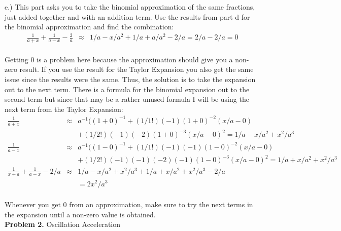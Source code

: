 \documentclass[11pt]{amsart}
\begin{document}
e.) This part asks you to take the binomial approximation of the same fractions, just added together and with an addition term. Use the results from part d for the binomial approximation and find the combination: \\ 
\begin{eqnarray*}
\frac{1}{a+x} + \frac{1}{a-x} - \frac{2}{a} &\approx& 1/a - x/a^{2} + 1/a + a/a^{2} -2/a = 2/a - 2/a = 0 
\end{eqnarray*} \\
Getting 0 is a problem here because the approximation should give you a non-zero result. If you use the result for the Taylor Expansion you also get the same issue since the results were the same. Thus, the solution is to take the expansion out to the next term. There is a formula for the binomial expansion out to the second term but since that may be a rather unused formula I will be using the next term from the Taylor Expansion: \\ 
\begin{eqnarray*} 
\frac{1}{a+x} &\approx&  a^{-1}((1+0)^{-1} + (1/1!)(-1)(1+0)^{-2}(x/a-0)   \\
                     & & + (1/2!)(-1)(-2)(1+0)^{-3}(x/a-0)^{2} = 1/a - x/a^{2} + x^{2}/a^{3} \\
\frac{1}{a-x}  &\approx&  a^{-1}((1-0)^{-1} + (1/1!)(-1)(-1)(1-0)^{-2}(x/a-0)  \\
                     & & + (1/2!)(-1)(-1)(-2)(-1)(1-0)^{-3}(x/a-0)^{2} = 1/a + x/a^{2} + x^{2}/a^{3} \\
\frac{1}{x+a} + \frac{1}{a-x} - 2/a &\approx& 1/a - x/a^{2} + x^{2}/a^{3} + 1/a + x/a^{2}  + x^{2}/a^{3} -2/a \\
		     & & = 2x^{2}/a^{3} 
\end{eqnarray*} \\
Whenever you get 0 from an approximation, make sure to try the next terms in the expansion until a non-zero value is obtained. \\ 

\textbf{Problem 2.} Oscillation Acceleration \\ 
\end{document}
